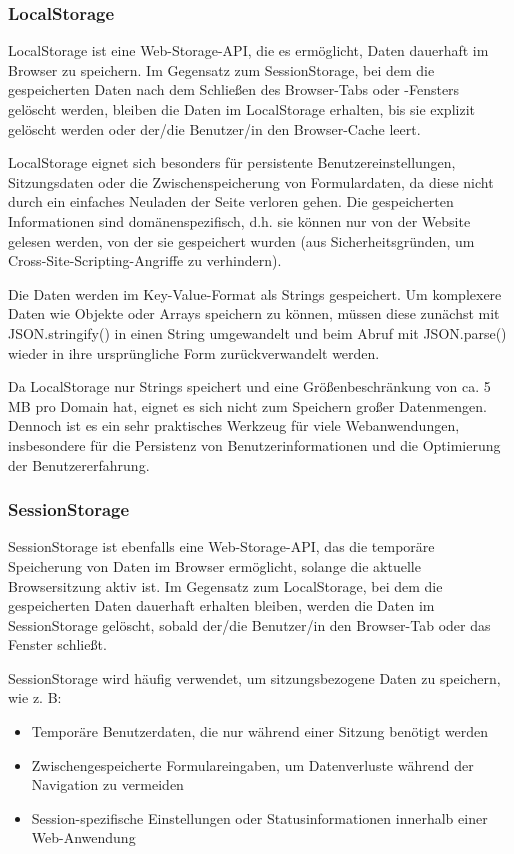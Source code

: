 \subsubsection{LocalStorage}

LocalStorage ist eine Web-Storage-API, die es ermöglicht, Daten dauerhaft im Browser zu speichern. Im Gegensatz zum SessionStorage, bei dem die gespeicherten Daten nach dem Schließen des Browser-Tabs oder -Fensters gelöscht werden, bleiben die Daten im LocalStorage erhalten, bis sie explizit gelöscht werden oder der/die Benutzer/in den Browser-Cache leert.

LocalStorage eignet sich besonders für persistente Benutzereinstellungen, Sitzungsdaten oder die Zwischenspeicherung von Formulardaten, da diese nicht durch ein einfaches Neuladen der Seite verloren gehen. Die gespeicherten Informationen sind domänenspezifisch, d.h. sie können nur von der Website gelesen werden, von der sie gespeichert wurden (aus Sicherheitsgründen, um Cross-Site-Scripting-Angriffe zu verhindern).

Die Daten werden im Key-Value-Format als Strings gespeichert. Um komplexere Daten wie Objekte oder Arrays speichern zu können, müssen diese zunächst mit JSON.stringify() in einen String umgewandelt und beim Abruf mit JSON.parse() wieder in ihre ursprüngliche Form zurückverwandelt werden.

Da LocalStorage nur Strings speichert und eine Größenbeschränkung von ca. 5 MB pro Domain hat, eignet es sich nicht zum Speichern großer Datenmengen. Dennoch ist es ein sehr praktisches Werkzeug für viele Webanwendungen, insbesondere für die Persistenz von Benutzerinformationen und die Optimierung der Benutzererfahrung.

\subsubsection{SessionStorage}

SessionStorage ist ebenfalls eine Web-Storage-API, das die temporäre Speicherung von Daten im Browser ermöglicht, solange die aktuelle Browsersitzung aktiv ist. Im Gegensatz zum LocalStorage, bei dem die gespeicherten Daten dauerhaft erhalten bleiben, werden die Daten im SessionStorage gelöscht, sobald der/die Benutzer/in den Browser-Tab oder das Fenster schließt.

SessionStorage wird häufig verwendet, um sitzungsbezogene Daten zu speichern, wie z. B:

\begin{itemize}
    \item 
    Temporäre Benutzerdaten, die nur während einer Sitzung benötigt werden

    \item 
    Zwischengespeicherte Formulareingaben, um Datenverluste während der Navigation zu vermeiden

    \item
    Session-spezifische Einstellungen oder Statusinformationen innerhalb einer Web-Anwendung

\end{itemize}

